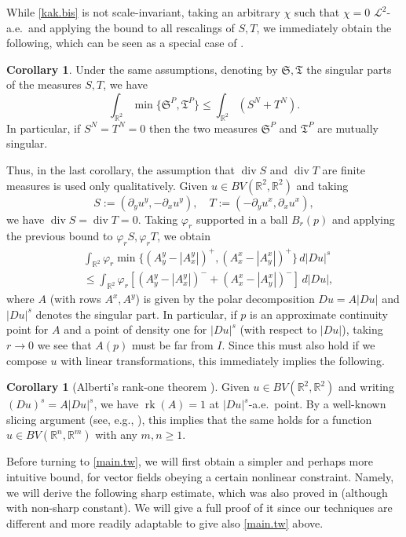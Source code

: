 \documentclass[11pt,a4paper]{amsart}
\newcommand{\R}{\mathbb{R}}
\newcommand{\de}{\partial}
\theoremstyle{definition}
\newtheorem{corollary}[definition]{Corollary}
\DeclareMathOperator{\dive}{div}
\begin{document}
While \cref{kak.bis} is not scale-invariant, taking an arbitrary $\chi$ such that $\chi=0$ $\mathcal{L}^2$-a.e.\ and applying the bound to all rescalings of $S,T$, we immediately obtain the following,
which can be seen as a special case of \cite[Proposition 8.6]{ACP}.

\begin{corollary}
    Under the same assumptions, denoting by $\mathfrak{S},\mathfrak{T}$ the singular parts of the measures $S,T$, we have
    $$\int_{\R^2} \min\{\mathfrak{S}^P,\mathfrak{T}^P\}\le \int_{\R^2}(S^N+T^N).$$
    In particular, if $S^N=T^N=0$ then the two measures $\mathfrak{S}^P$ and $\mathfrak{T}^P$
    are mutually singular.
\end{corollary}

Thus, in the last corollary, the assumption that $\dive S$ and $\dive T$ are finite measures is used only qualitatively.
Given $u\in BV(\R^2,\R^2)$ and taking
$$S:=(\de_yu^y,-\de_x u^y),\quad T:=(-\de_yu^x,\de_x u^x),$$
we have $\dive S=\dive T=0$. Taking $\varphi_r$ supported in a ball $B_r(p)$ and applying the previous bound to $\varphi_r S,\varphi_r T$, we obtain
\begin{align*}
&\int_{\R^2} \varphi_r \min\{(A_y^y-|A_x^y|)^+,(A_x^x-|A_y^x|)^+\}\,d|Du|^s\\
&\le \int_{\R^2}\varphi_r[(A_y^y-|A_x^y|)^- + (A_x^x-|A_y^x|)^-]\,d|Du|,
\end{align*}
where $A$ (with rows $A^x,A^y$) is given by the polar decomposition $Du=A|Du|$ and $|Du|^s$ denotes the singular part. In particular, if $p$ is an approximate continuity point for $A$ and a point of density one for $|Du|^s$ (with respect to $|Du|$), taking $r\to0$ we see that $A(p)$ must be far from $I$. Since this must also hold if we compose $u$ with linear transformations, this immediately implies the following.

\begin{corollary}[Alberti's rank-one theorem \cite{Alberti,DR,MV}]
    Given $u\in BV(\R^2,\R^2)$ and writing $(Du)^s=A|Du|^s$, we have $\operatorname{rk}(A)=1$
    at $|Du|^s$-a.e.\ point.
    By a well-known slicing argument (see, e.g., \cite[Proposition 1.3]{DeLellis}), this implies that the same holds for a function $u\in BV(\R^n,\R^m)$ with any $m,n\ge1$.
\end{corollary}

Before turning to \cref{main.tw}, we will first obtain a simpler and perhaps more intuitive bound,
for vector fields obeying a certain nonlinear constraint.
Namely, we will derive the following sharp estimate, which was also proved in \cite[Theorem A]{GRS} (although with non-sharp constant).
We will give a full proof of it since our techniques are different and more readily adaptable to
give also \cref{main.tw} above.
\end{document}
